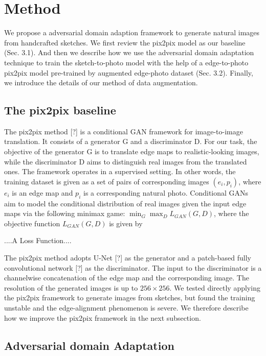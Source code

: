\section{Method}
We propose a adversarial domain adaption framework to generate natural images from handcrafted sketches. We first review the pix2pix model as our baseline (Sec. 3.1). And then we describe how we use the adversarial domain adaptation technique to train the sketch-to-photo model with the help of a edge-to-photo pix2pix model pre-trained by augmented edge-photo dataset (Sec. 3.2). Finally, we introduce the details of our method of data augmentation.
\subsection{The pix2pix baseline}
The pix2pix method [?] is a conditional GAN framework for image-to-image translation. It consists of a generator G and a discriminator D. For our task, the objective of the generator G is to translate edge maps to realistic-looking images, while the discriminator D aims to distinguish real images from the translated ones. The framework operates in a supervised setting. In other words, the training dataset is given as a set of pairs of corresponding images ${(e_i, p_i)}$, where $e_i$ is an edge map and $p_i$ is a corresponding natural photo. Conditional GANs aim to model the conditional distribution of real images given the input edge maps via the following minimax game: $\min_G \max_D L_{GAN}(G,D)$, where the objective function $L_{GAN}(G,D)$ is given by

....A Loss Function....

The pix2pix method adopts U-Net [?] as the generator and a patch-based fully convolutional network [?] as the discriminator. The input to the discriminator is a channelwise concatenation of the edge map and the corresponding image. The resolution of the generated images is up to $256 \times 256$. We tested directly applying the pix2pix framework to generate  images from sketches, but found the training unstable and the edge-alignment phenomenon is severe. We therefore describe how we improve the 
pix2pix framework in the next subsection.
\subsection{Adversarial domain Adaptation}
